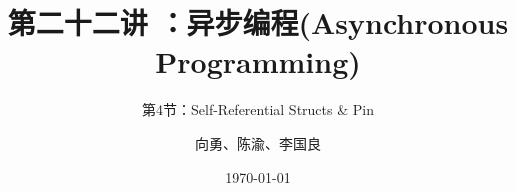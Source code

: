 


\title[第22讲]{第二十二讲 ：异步编程(Asynchronous Programming)}  %
\subtitle{第4节：Self-Referential Structs \& Pin}
\author{向勇、陈渝、李国良} %
\date{\today} %



\begin{frame}
\titlepage %
\end{frame}



